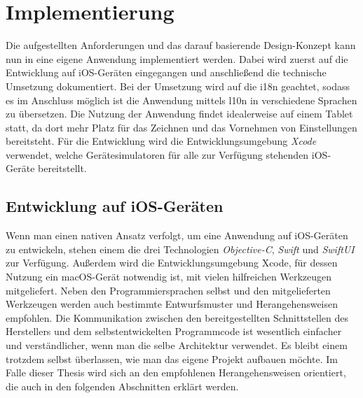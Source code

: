 \chapter{Implementierung}
\label{ch:implementation}
Die aufgestellten Anforderungen und das darauf basierende Design-Konzept kann nun in eine eigene Anwendung implementiert werden.
Dabei wird zuerst auf die Entwicklung auf iOS-Geräten eingegangen und anschließend die technische Umsetzung dokumentiert.
Bei der Umsetzung wird auf die \Gls{i18n} geachtet, sodass es im Anschluss möglich ist die Anwendung mittels \Gls{l10n} in verschiedene Sprachen zu übersetzen.\pbreak%
%
Die Nutzung der Anwendung findet idealerweise auf einem Tablet statt, da dort mehr Platz für das Zeichnen und das Vornehmen von Einstellungen bereitsteht.
Für die Entwicklung wird die Entwicklungsumgebung \textit{Xcode} verwendet, welche Gerätesimulatoren für alle zur Verfügung stehenden iOS-Geräte bereitstellt.

\section{Entwicklung auf iOS-Geräten}
\label{sec:devios}
Wenn man einen nativen Ansatz verfolgt, um eine Anwendung auf iOS-Geräten zu entwickeln, stehen einem die drei Technologien \textit{Objective-C}, \textit{Swift} und \textit{SwiftUI} zur Verfügung.
Außerdem wird die Entwicklungsumgebung Xcode, für dessen Nutzung ein macOS-Gerät notwendig ist, mit vielen hilfreichen Werkzeugen mitgeliefert.\pbreak%
%
Neben den Programmiersprachen selbst und den mitgelieferten Werkzeugen werden auch bestimmte Entwurfsmuster und Herangehensweisen empfohlen.
Die Kommunikation zwischen den bereitgestellten Schnittstellen des Herstellers und dem selbstentwickelten Programmcode ist wesentlich einfacher und verständlicher, wenn man die selbe Architektur verwendet.
Es bleibt einem trotzdem selbst überlassen, wie man das eigene Projekt aufbauen möchte.
Im Falle dieser Thesis wird sich an den empfohlenen Herangehensweisen orientiert, die auch in den folgenden Abschnitten erklärt werden.

